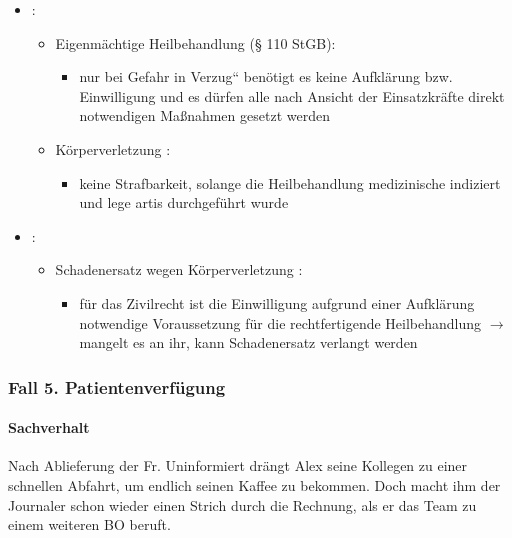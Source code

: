 \begin{itemize}
	\item {}:
	\begin{itemize}
		\item Eigenmächtige  Heilbehandlung  ({\S} 110 StGB): 
		\begin{itemize}
			\item nur bei {\quotedblbase}Gefahr in Verzug{\textquotedblleft} ben\"otigt es
			keine Aufklärung bzw. Einwilligung und es d\"urfen alle nach Ansicht
			der Einsatzkräfte direkt notwendigen Ma{\ss}nahmen gesetzt werden
		\end{itemize}
		\item K\"orperverletzung :
		\begin{itemize}
			\item keine Strafbarkeit, solange die Heilbehandlung medizinische indiziert und lege artis
			durchgef\"uhrt wurde
		\end{itemize}
	\end{itemize}
	\item {}:
	\begin{itemize}
		\item 
		Schadenersatz wegen K\"orperverletzung :

		\begin{itemize}
			\item {f\"ur das Zivilrecht ist die Einwilligung aufgrund einer Aufklärung
			notwendige Voraussetzung f\"ur die rechtfertigende Heilbehandlung ${\rightarrow}$
			mangelt es an ihr, kann Schadenersatz verlangt werden}

		\end{itemize}
		
	\end{itemize}
\end{itemize}

\subsubsection{Fall 5.
Patientenverf\"ugung}\label{topic:patientenverfuegung}
\paragraph*{Sachverhalt}

Nach Ablieferung der Fr. Uninformiert drängt Alex seine Kollegen zu
einer schnellen Abfahrt, um endlich seinen Kaffee zu bekommen. Doch
macht ihm der Journaler schon wieder einen Strich durch die Rechnung,
als er das Team zu einem weiteren BO beruft.

